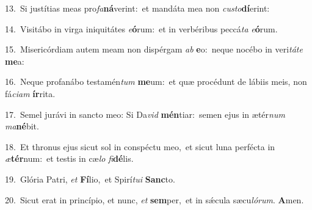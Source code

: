 {\numbfont\textcolor{\numbcolor}{13.}}~Si justítias meas pro\-\textit{fa}\-\textbf{ná}verint:~\star et mandáta mea non \textit{cus}\-\textit{to}\textbf{dí}erint:\par
{\numbfont\textcolor{\numbcolor}{14.}}~Visitábo in virga iniquitátes \textit{e}\-\textbf{ó}rum:~\star et in verbéribus peccá\textit{ta} \textit{e}\-\textbf{ó}rum.\par
{\numbfont\textcolor{\numbcolor}{15.}}~Misericórdiam autem meam non dispérgam \textit{ab} \textbf{e}\-o:~\star neque nocébo in veri\-\textit{tá}\-\textit{te} \textbf{me}\-a:\par
{\numbfont\textcolor{\numbcolor}{16.}}~Neque profanábo testamén\textit{tum} \textbf{me}\-um:~\star et quæ procédunt de lábiis meis, non fá\-\textit{ci}\-\textit{am} \textbf{ír}\-rita.\par
{\numbfont\textcolor{\numbcolor}{17.}}~Semel jurávi in sancto meo: Si Da\textit{vid} \textbf{mén}\-tiar:~\star semen ejus in ætér\textit{num} \textit{ma}\-\textbf{né}bit.\par
{\numbfont\textcolor{\numbcolor}{18.}}~Et thronus ejus sicut sol in conspéctu meo,~\dagger et sicut luna perfécta in \textit{æ}\-\textbf{tér}num:~\star et testis in cæ\textit{lo} \textit{fi}\-\textbf{dé}lis.\par
{\numbfont\textcolor{\numbcolor}{19.}}~Glória Patri, \textit{et} \textbf{Fí}\-lio,~\star et Spirí\-\textit{tu}\-\textit{i} \textbf{Sanc}\-to.\par
{\numbfont\textcolor{\numbcolor}{20.}}~Sicut erat in princípio, et nunc, \textit{et} \textbf{sem}\-per,~\star et in sǽcula sæcu\-\textit{ló}\-\textit{rum}. \textbf{A}\-men.\par
